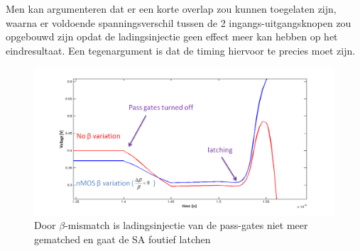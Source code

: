 Men kan argumenteren dat er een korte overlap zou kunnen toegelaten zijn, waarna er voldoende spanningsverschil tussen de 2 ingangs-uitgangsknopen zou opgebouwd zijn opdat de ladingsinjectie geen effect meer kan hebben op het eindresultaat. Een tegenargument is dat de timing hiervoor te precies moet zijn.
\begin{figure}
  \centering
  \includegraphics[scale=0.4]{../fig/hfdstk-sensamp-chargeinjectionmismatch.png}
  \caption{Door $\beta$-mismatch is ladingsinjectie van de pass-gates niet meer gematched en gaat de SA foutief latchen}
  \label{fig:chargeinjectionmismatch}
\end{figure}

